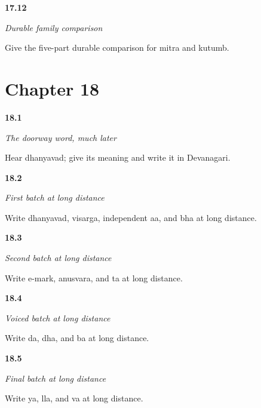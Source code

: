 \noindent\begin{minipage}[t]{\linewidth}
\raggedright
\hypertarget{review-MR-R14-kutumb-r3-check}{\textbf{17.12}} \emph{Durable family comparison}\par
\small Give the five-part durable comparison for mitra and kutumb.
\end{minipage}\par\medskip

\section*{Chapter 18}

\noindent\begin{minipage}[t]{\linewidth}
\raggedright
\hypertarget{review-MR-R18-script-warmup-check}{\textbf{18.1}} \emph{The doorway word, much later}\par
\small Hear dhanyavad; give its meaning and write it in Devanagari.
\end{minipage}\par\medskip

\noindent\begin{minipage}[t]{\linewidth}
\raggedright
\hypertarget{review-MR-R18-script-a-r4-check}{\textbf{18.2}} \emph{First batch at long distance}\par
\small Write dhanyavad, visarga, independent aa, and bha at long distance.
\end{minipage}\par\medskip

\noindent\begin{minipage}[t]{\linewidth}
\raggedright
\hypertarget{review-MR-R18-script-b-r4-check}{\textbf{18.3}} \emph{Second batch at long distance}\par
\small Write e-mark, anusvara, and ta at long distance.
\end{minipage}\par\medskip

\noindent\begin{minipage}[t]{\linewidth}
\raggedright
\hypertarget{review-MR-R18-script-c-r4-check}{\textbf{18.4}} \emph{Voiced batch at long distance}\par
\small Write da, dha, and ba at long distance.
\end{minipage}\par\medskip

\noindent\begin{minipage}[t]{\linewidth}
\raggedright
\hypertarget{review-MR-R18-script-d-r4-check}{\textbf{18.5}} \emph{Final batch at long distance}\par
\small Write ya, lla, and va at long distance.
\end{minipage}\par\medskip

